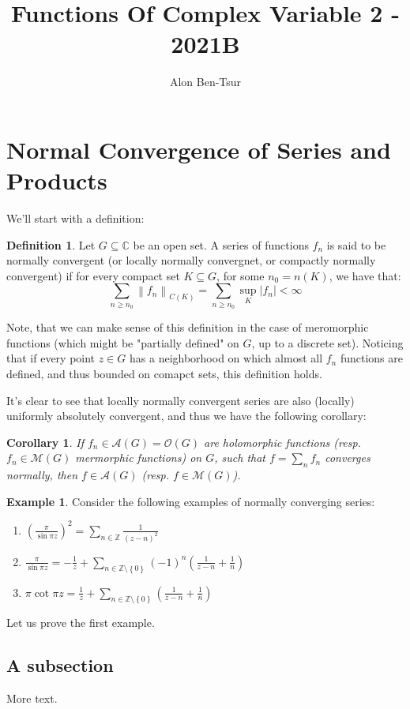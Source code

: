 \documentclass[11pt]{article} %
\title{Functions Of Complex Variable 2 - 2021B}
\author{Alon Ben-Tsur}
\newtheorem{corollary}[theorem]{Corollary}
\theoremstyle{definition}
\newtheorem{definition}[theorem]{Definition}
\newtheorem{example}[theorem]{Example}
\begin{document}
\maketitle

\section{Normal Convergence of Series and Products}

We'll start with a definition:

\begin{definition}
Let $G \subseteq \mathbb{C}$ be an open set. A series of functions $f_n$ is said to be normally convergent (or locally normally convergnet, or compactly normally convergent) if for every compact set $K \subseteq G$, for some $n_0 = n\left(K\right)$, we have that:
\[ \sum _{n \geq n_0} \left\lVert f_n \right\rVert_{C\left(K\right)} = \sum _{n \geq n_0} \sup _K \left|f_n\right| < \infty \]
\end{definition}

Note, that we can make sense of this definition in the case of meromorphic functions (which might be "partially defined" on $G$, up to a discrete set). Noticing that if every point $z \in G$ has a neighborhood on which almost all $f_n$ functions are defined, and thus bounded on comapct sets, this definition holds.

It's clear to see that locally normally convergent series are also (locally) uniformly absolutely convergent, and thus we have the following corollary:

\begin{corollary}
If $f_n \in \mathcal{A}\left(G\right) = \mathcal{O}\left(G\right)$ are holomorphic functions (resp. $f_n \in \mathcal{M}\left(G\right)$ mermorphic functions) on $G$, such that $f = \sum_n f_n$ converges normally, then $f \in \mathcal{A}\left(G\right)$ (resp. $f \in \mathcal{M}\left(G\right)$).
\end{corollary}

\begin{example}
Consider the following examples of normally converging series:

\begin{enumerate}
\item $\left(\frac{\pi}{\sin\pi z}\right)^2 = \sum_{n\in\mathbb{Z}} \frac{1}{\left(z-n\right)^2}$
\item $\frac{\pi}{\sin\pi z}= -\frac{1}{z} + \sum_{n\in\mathbb{Z}\setminus\left\{0\right\}}\left(-1\right)^n \left(\frac{1}{z-n} + \frac{1}{n}\right)$
\item $\pi \cot \pi z =  \frac{1}{z} + \sum_{n\in\mathbb{Z}\setminus\left\{0\right\}} \left(\frac{1}{z-n} + \frac{1}{n}\right)$
\end{enumerate}
\end{example}

Let us prove the first example.

\subsection{A subsection}

More text.
\end{document}
